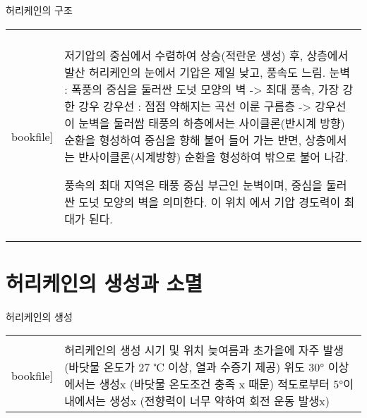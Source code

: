 \begin{frame}[t]{허리케인의 구조}
	\begin{tabular}{ll}
		\begin{minipage}[t]{0.45\textwidth}\scriptsize
			\begin{figure}[t]
				\texttt{[image: \\bookfile]}
			\end{figure}
		\end{minipage}	
		&
		\begin{minipage}[t]{0.5\textwidth} \scriptsize	
			저기압의 중심에서 수렴하여 상승(적란운 생성) 후, 상층에서 발산
			허리케인의 눈에서 기압은 제일 낮고, 풍속도 느림.
			눈벽 : 폭풍의 중심을 둘러싼 도넛 모양의 벽 -> 최대 풍속, 가장 강한 강우
			강우선 : 점점 약해지는 곡선 이룬 구름층 -> 강우선이 눈벽을 둘러쌈
			태풍의 하층에서는 사이클론(반시계 방향) 순환을 형성하여 중심을 향해 불어 들어 가는 반면, 상층에서는 반사이클론(시계방향) 순환을 형성하여 밖으로 불어 나감.
			
			풍속의 최대 지역은 태풍 중심 부근인 눈벽이며, 중심을 둘러싼 도넛 모양의 벽을 의미한다. 
			이 위치 에서 기압 경도력이 최대가 된다.

			
			
		\end{minipage}
	\end{tabular}
\end{frame}





\section{허리케인의 생성과 소멸}




\begin{frame}[t]{허리케인의 생성}
	\begin{tabular}{ll}
		\begin{minipage}[t]{0.45\textwidth}\scriptsize
			\begin{figure}[t]
				\texttt{[image: \\bookfile]}
			\end{figure}
		\end{minipage}	
		&
		\begin{minipage}[t]{0.5\textwidth} \scriptsize	
			허리케인의 생성 시기 및 위치
			늦여름과 초가을에 자주 발생 (바닷물 온도가 27 ℃ 이상, 열과 수증기 제공)
			위도 30° 이상에서는 생성x (바닷물 온도조건 충족 x 때문)
			적도로부터 5°이내에서는 생성x (전향력이 너무 약하여 회전 운동 발생x)
			
			
		\end{minipage}
	\end{tabular}
\end{frame}




